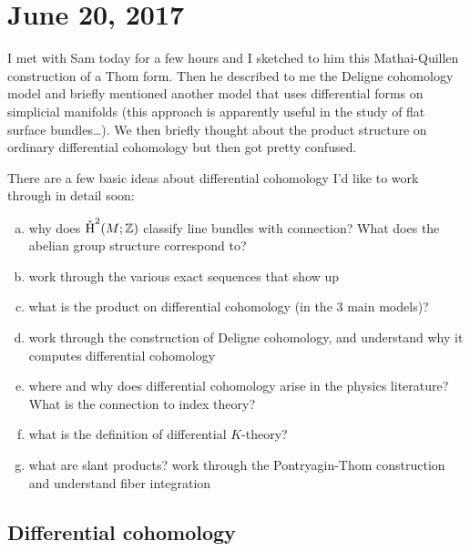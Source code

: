 \documentclass{amsart}
\begin{document}
\section{June 20, 2017}

I met with Sam today for a few hours and I sketched to him this Mathai-Quillen
construction of a Thom form. Then he described to me the Deligne cohomology
model and briefly mentioned another model that uses differential forms on
simplicial manifolds (this approach is apparently useful in the study of flat
surface bundles\ldots). We then briefly thought about the product structure
on ordinary differential cohomology but then got pretty confused.

There are a few basic ideas about differential cohomology I'd like to work through
in detail soon:
\begin{enumerate}[(a)]
    \item why does $\check{\operatorname{H}}^2(M;\mathbb{Z})$ classify line bundles with connection? What
        does the abelian group structure correspond to?
    \item work through the various exact sequences that show up
    \item what is the product on differential cohomology (in the 3 main models)?
    \item work through the construction of Deligne cohomology, and understand
        why it computes differential cohomology
    \item where and why does differential cohomology arise in the physics literature?
        What is the connection to index theory?
    \item what is the definition of differential $K$-theory?
    \item what are slant products? work through the Pontryagin-Thom construction
        and understand fiber integration
\end{enumerate}

\subsection{Differential cohomology}
\end{document}
